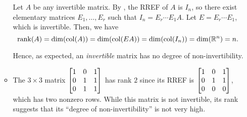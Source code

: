 \begin{enumerate}
\begin{itemize}
\begin{pf}
Let \(A\) be any invertible matrix. By , the
RREF of \(A\) is \(I_n\), so there exist elementary matrices \(E_1,\dotsc,E_r\)
such that \(I_n=E_r\dotsb E_1 A\). Let \(E=E_r\dotsb E_1\), which is
invertible. Then, we have
\[
\operatorname{rank}(A)=\dim(\operatorname{col}(A))
=\dim(\operatorname{col}(EA))
=\dim(\operatorname{col}(I_n))
=\dim(\mathbb{R}^n)
=n.
\]
\end{pf}

Hence, as expected, an \emph{invertible} matrix has no degree of
non-invertibility.
\item The \(3\times 3\) matrix \(\mqty[1&0&1\\ 0&1&1\\ 0&1&1]\) has rank \(2\)
since its RREF is \(\mqty[1&0&1\\ 0&1&1\\ 0&0&0]\), which has two nonzero rows.
While this matrix is not invertible, its rank suggests that its ``degree of
non-invertibility'' is not very high.
\end{itemize}
\end{enumerate}
